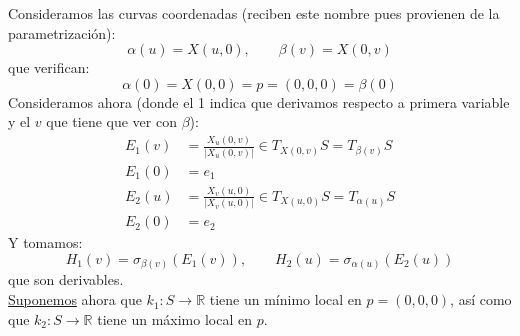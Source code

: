 \noindent
Consideramos las curvas coordenadas (reciben este nombre pues provienen de la parametrización):
\begin{equation*}
    \alpha(u) = X(u,0), \qquad \beta(v) = X(0,v)
\end{equation*}
que verifican:
\begin{equation*}
    \alpha(0) = X(0,0) = p = (0,0,0) = \beta(0)
\end{equation*}
Consideramos ahora (donde el 1 indica que derivamos respecto a primera variable y el $v$ que tiene que ver con $\beta$):
\begin{align*}
    E_1(v) &= \frac{X_u(0,v)}{|X_u(0,v)|}\in T_{X(0,v)}S = T_{\beta(v)}S \\
    E_1(0) &= e_1 \\
    E_2(u) &= \frac{X_v(u,0)}{|X_v(u,0)|}\in T_{X(u,0)}S = T_{\alpha(u)}S \\
    E_2(0) &= e_2
\end{align*}
Y tomamos:
\begin{equation*}
    H_1(v) = \sigma_{\beta(v)}(E_1(v)), \qquad H_2(u) = \sigma_{\alpha(u)}(E_2(u))
\end{equation*}
que son derivables.\\

\noindent
\underline{Suponemos} ahora que $k_1:S\to\mathbb{R}$ tiene un mínimo local en $p = (0,0,0)$, así como que $k_2:S\to\mathbb{R}$ tiene un máximo local en $p$.\\

